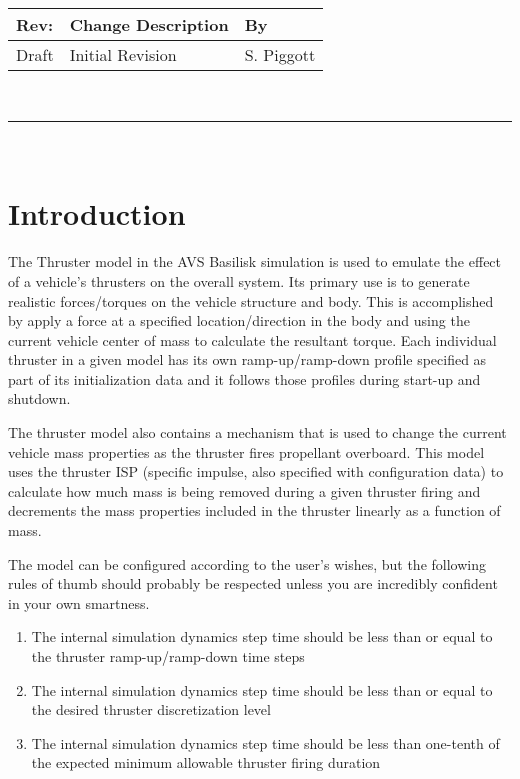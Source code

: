 \documentclass[]{BasiliskReportMemo}
\begin{document}
\makeCover



%
%
\pagestyle{empty}
{\renewcommand{\arraystretch}{2}
\noindent
\begin{longtable}{|p{0.5in}|p{4.5in}|p{1.14in}|}
\hline
{\bfseries Rev}: & {\bfseries Change Description} & {\bfseries By} \\
\hline
Draft & Initial Revision & S. Piggott \\
\hline

\end{longtable}
}

\newpage
\setcounter{page}{1}
\pagestyle{fancy}

\tableofcontents
~\\ \hrule ~\\


\section{Introduction}
The Thruster model in the AVS Basilisk simulation is used to emulate the effect 
of a vehicle's thrusters on the overall system.  Its primary use is to generate 
realistic forces/torques on the vehicle structure and body.  This is 
accomplished by apply a force at a specified location/direction in the body and 
using the current vehicle center of mass to calculate the resultant torque.  
Each individual thruster in a given model has its own ramp-up/ramp-down profile 
specified as part of its initialization data and it follows those profiles during 
start-up and shutdown.

The thruster model also contains a mechanism that is used to change the current 
vehicle mass properties as the thruster fires propellant overboard.  This model 
uses the thruster ISP (specific impulse, also specified with configuration data) 
to calculate how much mass is being removed during a given thruster firing and 
decrements the mass properties included in the thruster linearly as a function 
of mass.  

The model can be configured according to the user's wishes, but the following 
rules of thumb should probably be respected unless you are incredibly confident 
in your own smartness.
\begin{enumerate}
\item{The internal simulation dynamics step time should be less than or equal 
     to the thruster ramp-up/ramp-down time steps}
\item{The internal simulation dynamics step time should be less than or equal to 
     the desired thruster discretization level}
\item{The internal simulation dynamics step time should be less than one-tenth 
    of the expected minimum allowable thruster firing duration}
\end{enumerate}
\end{document}
